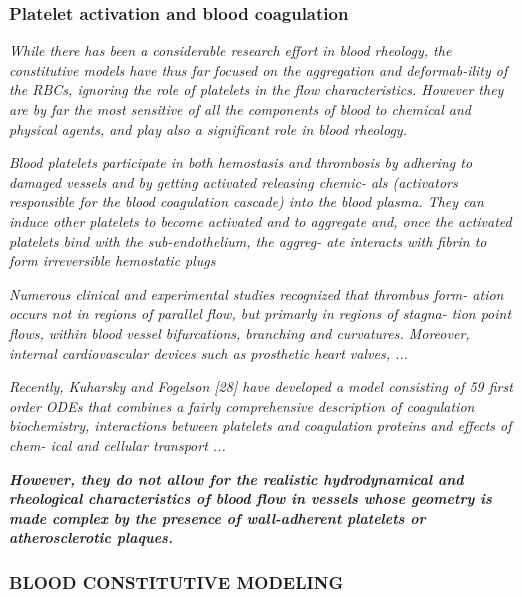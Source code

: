 \documentclass[11pt,letterpaper]{article}
\begin{document}
\subsubsection*{Platelet activation and blood coagulation}



\textit{ While there has been a considerable research effort in blood rheology, the
constitutive models have thus far focused on the aggregation and deformab-ility of the RBCs, ignoring the role of platelets in the flow characteristics.
However they are by far the most sensitive of all the components of blood
to chemical and physical agents, and play also a significant role in blood
rheology.}

\textit{Blood platelets participate in both hemostasis and thrombosis by adhering to damaged vessels and by getting activated releasing chemic- als (activators responsible for the blood coagulation cascade) into the blood plasma. They can induce other platelets to become activated and to aggregate and, once the activated platelets bind with the sub-endothelium, the aggreg- ate interacts with fibrin to form irreversible hemostatic plugs}


\textit{Numerous clinical and experimental studies recognized that thrombus form- ation occurs not in regions of parallel flow, but primarly in regions of stagna- tion point flows, within blood vessel bifurcations, branching and curvatures. Moreover, internal cardiovascular devices such as prosthetic heart valves, ...}

\textit{Recently, Kuharsky and Fogelson [28] have developed a model consisting of 59 first order ODEs that combines a fairly comprehensive description of coagulation biochemistry, interactions between platelets and coagulation proteins and effects of chem- ical and cellular transport ...}


\textit{\textbf{However, they do not allow for the realistic hydrodynamical and rheological characteristics of blood flow in vessels whose geometry is made complex by the presence of wall-adherent platelets or atherosclerotic plaques.}}



\subsubsection*{BLOOD CONSTITUTIVE MODELING}
\end{document}

